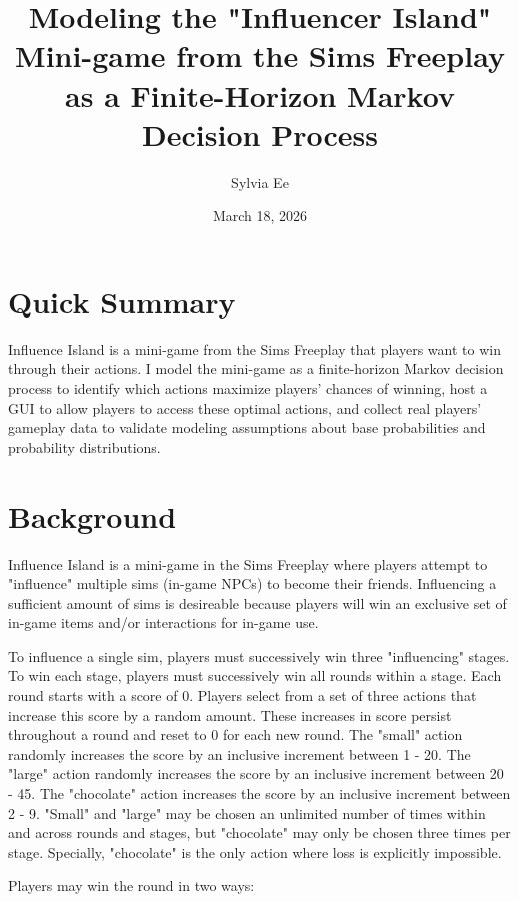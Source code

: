 \documentclass{article}
\title{Modeling the "Influencer Island" Mini-game from the Sims Freeplay as a Finite-Horizon Markov Decision Process}
\author{Sylvia Ee}
\date{March 18, 2026}
\begin{document}
\maketitle

\section{Quick Summary}
Influence Island is a mini-game from the Sims Freeplay that players want to win through their actions. 
I model the mini-game as a finite-horizon Markov decision process to identify which actions maximize players' chances
of winning, host a GUI to allow players to access these optimal actions, and collect real players' gameplay data to validate
modeling assumptions about base probabilities and probability distributions. 

\section{Background}

Influence Island is a mini-game in the Sims Freeplay where players attempt to "influence" multiple sims (in-game NPCs) to become their friends. 
Influencing a sufficient amount of sims is desireable because players will win an exclusive set of in-game items and/or interactions for in-game use.

To influence a single sim, players must successively win three "influencing" stages. To win each stage, players must successively win all rounds within a stage. 
Each round starts with a score of 0. Players select from a set of three actions that increase this score by a random amount. 
These increases in score persist throughout a round and reset to 0 for each new round. 
The "small" action randomly increases the score by an inclusive increment between 1 - 20. The "large" action randomly 
increases the score by an inclusive increment between 20 - 45. The "chocolate" action increases the score by an inclusive 
increment between 2 - 9. "Small" and "large" may be chosen an unlimited number of times within and across rounds and stages,
but "chocolate" may only be chosen three times per stage. Specially, "chocolate" is the only action where loss is explicitly impossible. 

Players may win the round in two ways: 
\end{document}
